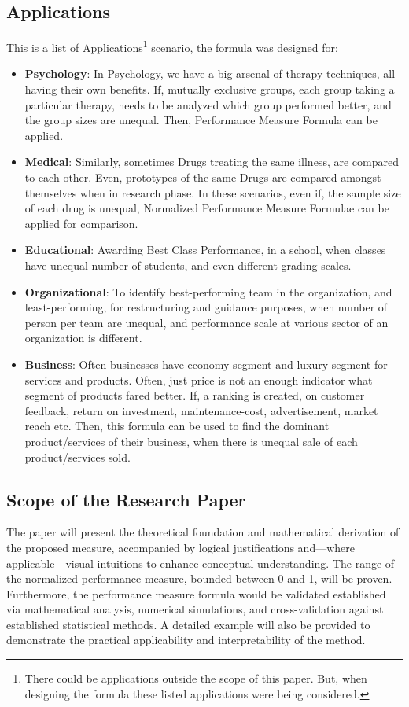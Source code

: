 \documentclass[a4paper,fleqn,review]{cas-sc}
\begin{document}
\subsection{Applications}
This is a list of Applications\footnote{There could be applications outside the scope of this paper. But, when designing the formula these listed applications were being considered.} scenario, the formula was designed for:
\begin{itemize}
	\item \textbf{Psychology}: In Psychology, we have a big arsenal of therapy techniques, all having their own benefits. If, mutually exclusive groups, each group taking a particular therapy, needs to be analyzed which group performed better, and the group sizes are unequal. Then, Performance Measure Formula can be applied.
	\item \textbf{Medical}: Similarly, sometimes Drugs treating the same illness, are compared to each other. Even, prototypes of the same Drugs are compared amongst themselves when in research phase. In these scenarios, even if, the sample size of each drug is unequal, Normalized Performance Measure Formulae can be applied for comparison.
    \item \textbf{Educational}: Awarding Best Class Performance, in a school, when classes have unequal number of students, and even different grading scales.
    \item \textbf{Organizational}: To identify best-performing team in the organization, and least-performing, for restructuring and guidance purposes, when number of person per team are unequal, and performance scale at various sector of an organization is different.
   \item \textbf{Business}: Often businesses have economy segment and luxury segment for services and products. Often, just price is not an enough indicator what segment of products fared better. If, a ranking is created, on customer feedback, return on investment, maintenance-cost, advertisement, market reach etc. Then, this formula can be used to find the dominant product/services of their business, when there is unequal sale of each product/services sold.
\end{itemize}

\subsection{Scope of the Research Paper}
The paper will present the theoretical foundation and mathematical derivation of the proposed measure, accompanied by logical justifications and—where applicable—visual intuitions to enhance conceptual understanding. The range of the normalized performance measure, bounded between 0 and 1, will be proven. Furthermore, the performance measure formula would be validated established via mathematical analysis, numerical simulations, and cross-validation against established statistical methods. A detailed example will also be provided to demonstrate the practical applicability and interpretability of the method.
\end{document}
